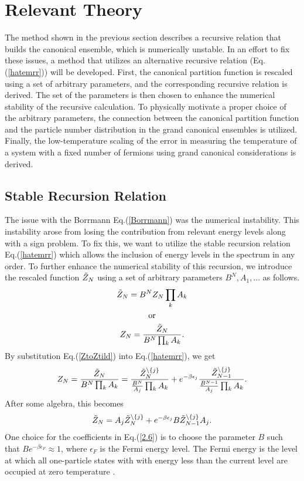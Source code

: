 \chapter{Relevant Theory} \label{ch:ns-equations}
\begin{em}
The method shown in the previous section describes a recursive relation that builds the canonical ensemble, which is numerically unstable. In an effort to fix these issues,  a method that utilizes an alternative recursive relation (Eq.\@(\ref{hatemrr})) will be developed. First, the canonical partition function is rescaled using a set of arbitrary parameters, and the corresponding recursive relation is derived. The set of the parameters is then chosen to enhance the numerical stability of the recursive calculation. To physically motivate a proper choice of the arbitrary parameters, the connection between the canonical partition function and the particle number distribution in the grand canonical ensembles is utilized. Finally, the low-temperature scaling of the error in measuring the temperature of a system with a fixed number of fermions using grand canonical considerations is derived.
\end{em}


\section{Stable Recursion Relation}
The issue with the Borrmann Eq.\@ (\ref{Borrmann}) was the numerical instability. This instability arose from losing the contribution from relevant energy levels along with a sign problem. To fix this, we want to utilize the stable recursion relation Eq.\@ (\ref{hatemrr}) which allows the inclusion of energy levels in the spectrum in any order. To further enhance the numerical stability of this recursion, we introduce the rescaled function $\Tilde{Z}_N$ using a set of arbitrary parameters ${B^N,A_1,...}$ as follows.
\begin{gather}
    \Tilde{Z}_N = B^N Z_N \prod_k A_k \label{ZtildtoZ}\\
    \text{or}\nonumber\\
    Z_N=\frac{\Tilde{Z}_N}{B^N \prod_k A_k}. \label{ZtoZtild}
\end{gather}
By substitution Eq.\@ (\ref{ZtoZtild}) into Eq.\@ (\ref{hatemrr}), we get
\begin{equation}
    Z_N=\frac{\Tilde{Z}_N}{B^N \prod_k A_k} = \frac{\Tilde{Z}_N^{\backslash\{j\}}}{\frac{B^N}{A_j} \prod_k A_k}+e^{-\beta\epsilon_j}\frac{\Tilde{Z}_{N-1}^{\backslash\{j\}}}{\frac{B^{N-1}}{A_j} \prod_k A_k}.
\end{equation}
After some algebra, this becomes
\begin{equation}
   \Tilde{Z}_N=A_j \Tilde{Z}_N^{\backslash\{j\}}+ e^{-\beta\epsilon_j} B \Tilde{Z}_{N-1}^{\backslash\{j\}} A_j.\label{2.6}
\end{equation}
One choice for the coefficients in Eq.\@ (\ref{2.6}) is to choose the parameter $B$ such that $B e^{-\beta\epsilon_F}\approx 1$, where $\epsilon_F$ is the Fermi energy level. The Fermi energy is the level at which all one-particle states with with energy less than the current level are occupied at zero temperature \cite{Kardar}.


